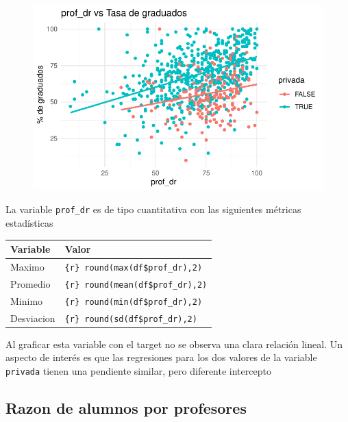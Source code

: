 \documentclass[
  letterpaper,
  DIV=11,
  numbers=noendperiod]{scrartcl}
\begin{document}
\begin{figure}[H]

{\centering \includegraphics{TP_final_files/figure-pdf/unnamed-chunk-18-1.pdf}

}

\end{figure}

La variable \texttt{prof\_dr} es de tipo cuantitativa con las siguientes
métricas estadísticas

\begin{longtable}[]{@{}ll@{}}
\toprule\noalign{}
Variable & Valor \\
\midrule\noalign{}
\endhead
\bottomrule\noalign{}
\endlastfoot
Maximo & \texttt{\{r\}\ round(max(df\$prof\_dr),2)} \\
Promedio & \texttt{\{r\}\ round(mean(df\$prof\_dr),2)} \\
Minimo & \texttt{\{r\}\ round(min(df\$prof\_dr),2)} \\
Desviacion & \texttt{\{r\}\ round(sd(df\$prof\_dr),2)} \\
\end{longtable}

Al graficar esta variable con el target no se observa una clara relación
lineal. Un aspecto de interés es que las regresiones para los dos
valores de la variable \texttt{privada} tienen una pendiente similar,
pero diferente intercepto

\hypertarget{razon-de-alumnos-por-profesores}{%
\subsection{Razon de alumnos por
profesores}\label{razon-de-alumnos-por-profesores}}
\end{document}
